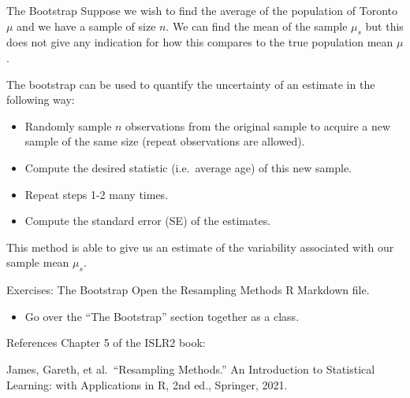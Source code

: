 \documentclass[
  ignorenonframetext,
  aspectratio=169,
]{beamer}
\providecommand{\tightlist}{%
  \setlength{\itemsep}{0pt}\setlength{\parskip}{0pt}}\usepackage{longtable,booktabs,array}
\begin{document}
\begin{frame}{The Bootstrap}
\protect\hypertarget{the-bootstrap}{}
Suppose we wish to find the average of the population of Toronto \(\mu\)
and we have a sample of size \(n\). We can find the mean of the sample
\(\mu_s\) but this does not give any indication for how this compares to
the true population mean \(\mu\).

\alert{The bootstrap can be used to quantify the uncertainty of an estimate}
in the following way:

\begin{itemize}
\item
  Randomly sample \(n\) observations from the original sample to acquire
  a new sample of the same size (repeat observations are allowed).
\item
  Compute the desired statistic (i.e.~average age) of this new sample.
\item
  Repeat steps 1-2 many times.
\item
  Compute the standard error (SE) of the estimates.
\end{itemize}

This method is able to give us an estimate of the variability associated
with our sample mean \(\mu_s\).
\end{frame}

\begin{frame}{Exercises: The Bootstrap}
\protect\hypertarget{exercises-the-bootstrap}{}
Open the Resampling Methods R Markdown file.

\begin{itemize}
\tightlist
\item
  Go over the ``The Bootstrap'' section together as a class.
\end{itemize}
\end{frame}

\begin{frame}{References}
\protect\hypertarget{references}{}
Chapter 5 of the ISLR2 book:

James, Gareth, et al.~``Resampling Methods.'' An Introduction to
Statistical Learning: with Applications in R, 2nd ed., Springer, 2021.
\end{frame}
\end{document}
